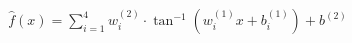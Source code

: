 \documentclass[preview]{standalone}
\begin{document}
\begin{align*}
\hat{f}(x) = \sum_{i=1}^{4} w^{(2)}_i \cdot \tan^{-1} \left( w^{(1)}_i x + b^{(1)}_i \right) + b^{(2)}
\end{align*}
\end{document}
